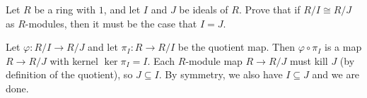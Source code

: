 \documentclass[12pt]{article}
\begin{document}
\newpage

\begin{tcolorbox}[title=Exercise 3]
Let $R$ be a ring with $1$, and let $I$ and $J$ be ideals of $R$. Prove that if $R/I \cong R/J$ as $R$-modules, then it must be the case that $I = J$.
\end{tcolorbox}

\bigskip

Let $\varphi : R / I \to R / J$ and let $\pi_{I} : R \to R / I$ be the quotient map. Then $\varphi \circ \pi_{I}$ is a map $R \to R / J$ with kernel $\ker \pi_{I} = I$. Each $R$-module map $R \to R / J$ must kill $J$ (by definition of the quotient), so $J \subseteq I$. By symmetry, we also have $I \subseteq J$ and we are done.

\newpage

\end{document}
